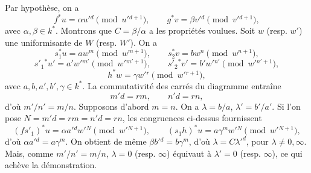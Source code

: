 \documentclass[11pt]{article}
\begin{document}
Par hypothèse, on a
\[
f^*u=\alpha u'{}^d\pmod {u'{}^{d+1}},\qquad
g^*v=\beta v'{}^d\pmod {v'{}^{d+1}},
\]
avec $\alpha,\beta\in k^*$. Montrons que $C=\beta/\alpha$ a les propriétés voulues. Soit $w$ (resp. $w'$) une uniformisante de $W$ (resp. $W'$). On a
\[
s_1^*u=aw^m\pmod {w^{m+1}},\qquad
s_2^*v=bw^n\pmod {w^{n+1}},
\]
\[
s'_1{}^*u'=a'w'{}^{m'}\pmod {w'{}^{m'+1}},\qquad
s'_2{}^*v'=b'w'{}^{n'}\pmod {w'{}^{n'+1}},
\]
\[
h^*w=\gamma w'{}^r\pmod {w'{}^{r+1}},
\]
avec $a,b,a',b',\gamma\in k^*$. La commutativité des carrés du diagramme entraîne
\[
m'd=rm,\qquad n'd=rn,
\]
d'où $m'/n'=m/n$. Supposons d'abord $m=n$. On a $\lambda=b/a$, $\lambda'=b'/a'$. Si l'on pose $N=m'd=rm=n'd=rn$, les congruences ci-dessus fournissent
\[
(fs'_1)^*u=\alpha a'{}^d w'{}^N\pmod {w'{}^{N+1}},\qquad
(s_1h)^*u=a\gamma^m w'{}^N\pmod {w'{}^{N+1}},
\]
d'où $\alpha a'{}^d=a\gamma^m$. On obtient de même $\beta b'{}^d=b\gamma^m$, d'où $\lambda=C{\lambda'}^d$, pour $\lambda\ne 0,\infty$. Mais, comme $m'/n'=m/n$, $\lambda=0$ (resp. $\infty$) équivaut à $\lambda'=0$ (resp. $\infty$), ce qui achève la démonstration.
\end{document}
